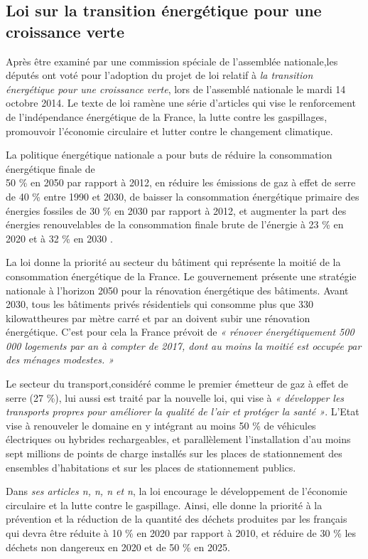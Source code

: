 \subsection{Loi sur la transition énergétique pour une croissance verte}


\smallbreak
Après être examiné par une commission spéciale de l'assemblée nationale,les députés ont voté pour l’adoption du projet de loi relatif à \textit{la transition énergétique pour une croissance verte}, lors de l’assemblé nationale le mardi 14 octobre 2014. Le texte de loi ramène une série d’articles qui vise le renforcement de l’indépendance énergétique de la France, la lutte contre les gaspillages, promouvoir l’économie circulaire et lutter contre le changement climatique.


\smallbreak
La politique énergétique nationale a pour buts de réduire la consommation énergétique finale de\\50 \% en 2050 par rapport à 2012, en réduire les émissions de gaz à effet de serre de 40 \% entre 1990 et 2030, de baisser la consommation énergétique primaire des énergies fossiles de 30 \% en 2030 par rapport à 2012, et augmenter la part des énergies renouvelables de la consommation finale brute de l’énergie à 23 \% en 2020 et à 32 \% en 2030 \cite{loi_te}.


\smallbreak
La loi donne la priorité au secteur du bâtiment qui représente la moitié de la consommation énergétique de la France. Le gouvernement présente une stratégie nationale à l’horizon 2050 pour la rénovation énergétique des bâtiments. Avant 2030, tous les bâtiments privés résidentiels qui consomme plus que 330 kilowattheures par mètre carré et par an doivent subir une rénovation énergétique. C’est pour cela la France prévoit de \textit{« rénover énergétiquement 500 000 logements par an à compter de 2017, dont au moins la moitié est occupée par des ménages modestes. »}


\smallbreak
Le secteur du transport,considéré comme le premier émetteur de gaz à effet de serre (27 \%), lui aussi est traité par la nouvelle loi, qui vise à \textit{« développer les transports propres pour améliorer la qualité de l’air et protéger la santé »}. L’Etat vise à renouveler le domaine en y intégrant au moins 50 \% de véhicules électriques ou hybrides rechargeables, et parallèlement l’installation d’au moins sept millions de points de charge installés sur les places de stationnement des ensembles d’habitations et sur les places de stationnement publics.


\smallbreak
Dans \textit{ses articles n, n, n et n}, la loi encourage le développement de l’économie circulaire et la lutte contre le gaspillage. Ainsi, elle donne la priorité à la prévention et la réduction de la quantité des déchets produites par les français qui devra être réduite à 10 \%  en 2020 par rapport à 2010, et réduire de 30 \% les déchets non dangereux en 2020 et de 50 \% en 2025.


